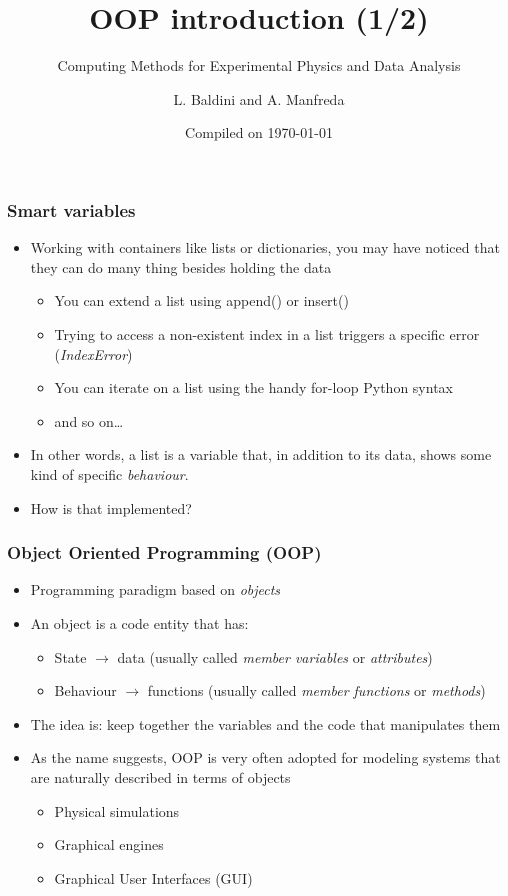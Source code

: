 \documentclass[9pt]{beamer}
\title{OOP introduction (1/2)}
\subtitle{Computing Methods for Experimental Physics and Data Analysis}
\date{Compiled on \today}
\author{L. Baldini and A. Manfreda}
\institute[INFN]{INFN--Pisa}
\begin{document}
\titleframe


\begin{frame}
  \frametitle{Smart variables}

  \begin{itemize}
    \item Working with containers like lists or dictionaries, you may have noticed
          that they can do many thing besides holding the data
    \medskip
    \begin{itemize}
      \item You can extend a list using append() or insert()
      \item Trying to access a non-existent index in a list triggers a specific error (\emph{IndexError})
      \item You can iterate on a list using the handy for-loop Python syntax
      \item and so on\dots
     \end{itemize}
     \medskip
     \item In other words, a list is a variable that, in addition to its data,
           shows some kind of specific \emph{behaviour}.
     \medskip
     \item How is that implemented?
  \end{itemize}
\end{frame}



\begin{frame}
  \frametitle{Object Oriented Programming (OOP)}

  \begin{itemize}
    \small
    \item Programming paradigm based on \emph{objects}
    \bigskip
    \item An object is a code entity that has:
    \smallskip
    \begin{itemize}
      \item \alert{State} $\rightarrow$ data (usually called \emph{member variables} or \emph{attributes})
      \smallskip
      \item \alert{Behaviour} $\rightarrow$ functions (usually called \emph{member functions} or \emph{methods})
    \end{itemize}
    \bigskip
    \item The idea is: keep together the variables and the code that manipulates them
    \bigskip
    \item As the name suggests, OOP is very often adopted for modeling systems that are naturally
          described in terms of objects
    \begin{itemize}
      \smallskip
      \item Physical simulations
      \smallskip
      \item Graphical engines
      \smallskip
      \item Graphical User Interfaces (GUI)
    \end{itemize}

  \end{itemize}
\end{frame}
\end{document}
